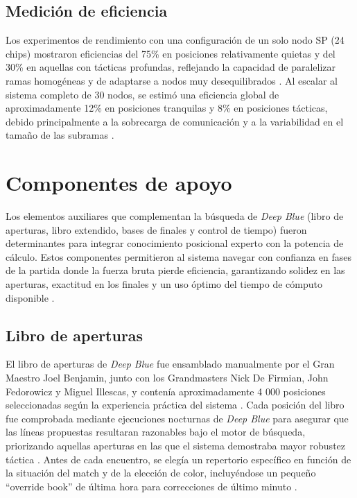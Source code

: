 \documentclass[a4paper, 12pt]{article}
\begin{document}
\subsection{Medición de eficiencia}

Los experimentos de rendimiento con una configuración de un solo 
nodo SP (24 chips) mostraron eficiencias del 75\% en posiciones 
relativamente quietas y del 30\% en aquellas con tácticas 
profundas, reflejando la capacidad de paralelizar ramas 
homogéneas y de adaptarse a nodos muy desequilibrados 
\cite{campbell2002deep}. Al escalar al sistema completo de 30 nodos, 
se estimó una eficiencia global de aproximadamente 12\% en 
posiciones tranquilas y 8\% en posiciones tácticas, debido 
principalmente a la sobrecarga de comunicación y a la 
variabilidad en el tamaño de las subramas \cite{campbell2002deep}.




















\section{Componentes de apoyo}

Los elementos auxiliares que complementan la búsqueda de 
\textit{Deep Blue} (libro de aperturas, libro extendido, 
bases de finales y control de tiempo) fueron determinantes para 
integrar conocimiento posicional experto con la potencia de 
cálculo. Estos componentes permitieron al sistema navegar con 
confianza en fases de la partida donde la fuerza bruta pierde 
eficiencia, garantizando solidez en las aperturas, exactitud en 
los finales y un uso óptimo del tiempo de cómputo disponible 
\cite{campbell2002deep}.


\subsection{Libro de aperturas}

El libro de aperturas de \textit{Deep Blue} fue ensamblado 
manualmente por el Gran Maestro Joel Benjamin, junto con los 
Grandmasters Nick De Firmian, John Fedorowicz y Miguel Illescas, 
y contenía aproximadamente 4 000 posiciones seleccionadas según 
la experiencia práctica del sistema \cite{campbell2002deep}. Cada 
posición del libro fue comprobada mediante ejecuciones nocturnas 
de \textit{Deep Blue} para asegurar que las líneas propuestas 
resultaran razonables bajo el motor de búsqueda, priorizando 
aquellas aperturas en las que el sistema demostraba mayor 
robustez táctica \cite{campbell2002deep}. Antes de cada encuentro, 
se elegía un repertorio específico en función de la situación 
del match y de la elección de color, incluyéndose un pequeño 
“override book” de última hora para correcciones de último 
minuto \cite{campbell2002deep}.
\end{document}
